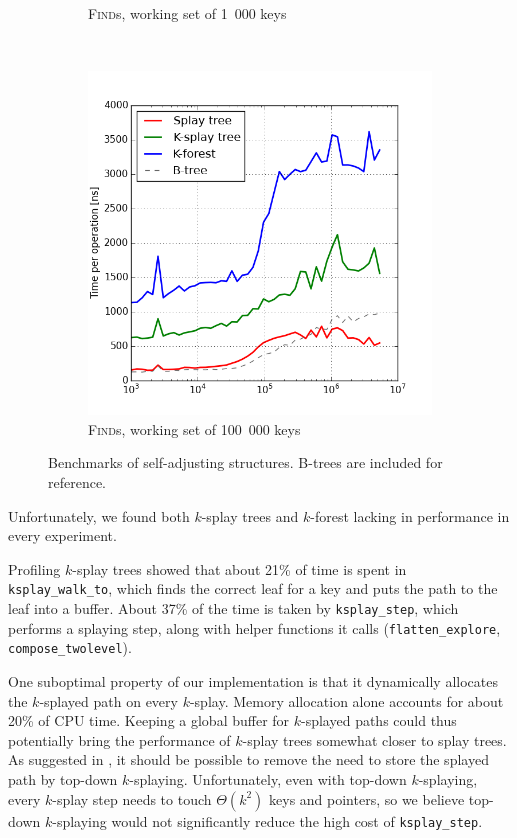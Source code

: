 \begin{figure}
\begin{subfigure}[b]{0.45\textwidth}
	\caption{\textsc{Find}s, working set of 1~000 keys}
\end{subfigure}
~
\begin{subfigure}[b]{0.45\textwidth}
	\includegraphics[width=\textwidth]{img/performance/self-adj-ws-100k}
	\caption{\textsc{Find}s, working set of 100~000 keys}
\end{subfigure}

\caption{Benchmarks of self-adjusting structures.
	B-trees are included for reference.}
\label{fig:self-adj-performance}
\end{figure}

Unfortunately, we found both $k$-splay trees and $k$-forest lacking in
performance in every experiment.

Profiling $k$-splay trees showed that about 21\% of time is spent in
\texttt{ksplay\_walk\_to}, which finds the correct leaf for a key and puts the
path to the leaf into a buffer. About 37\% of the time is taken by
\texttt{ksplay\_step}, which performs a splaying step, along with helper
functions it calls (\texttt{flatten\_explore}, \texttt{compose\_twolevel}).

One suboptimal property of our implementation is that it dynamically
allocates the $k$-splayed path on every $k$-splay. Memory allocation alone
accounts for about 20\% of CPU time.
Keeping a global buffer for $k$-splayed paths could thus potentially bring
the performance of $k$-splay trees somewhat closer to splay trees.
As suggested in \cite{ksplay-sherk}, it should be possible to remove the
need to store the splayed path by top-down $k$-splaying.
Unfortunately, even with top-down $k$-splaying, every $k$-splay step needs
to touch $\Theta(k^2)$ keys and pointers, so we believe top-down $k$-splaying
would not significantly reduce the high cost of \texttt{ksplay\_step}.

